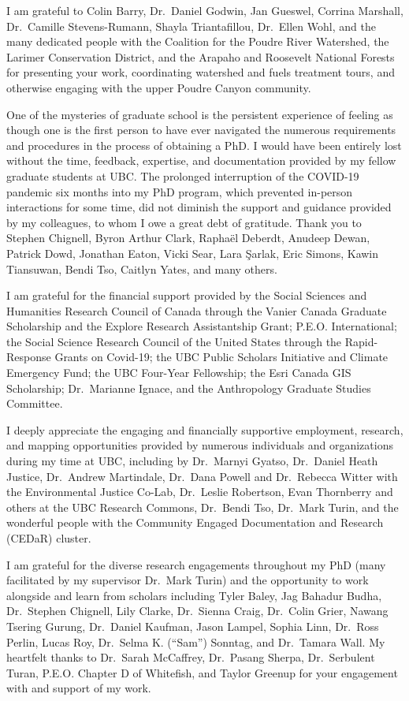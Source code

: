\documentclass[
]{article}
\begin{document}
I am grateful to Colin Barry, Dr.~Daniel Godwin, Jan Gueswel, Corrina Marshall, Dr.~Camille Stevens-Rumann, Shayla Triantafillou, Dr.~Ellen Wohl, and the many dedicated people with the Coalition for the Poudre River Watershed, the Larimer Conservation District, and the Arapaho and Roosevelt National Forests for presenting your work, coordinating watershed and fuels treatment tours, and otherwise engaging with the upper Poudre Canyon community.

One of the mysteries of graduate school is the persistent experience of feeling as though one is the first person to have ever navigated the numerous requirements and procedures in the process of obtaining a PhD. I would have been entirely lost without the time, feedback, expertise, and documentation provided by my fellow graduate students at UBC. The prolonged interruption of the COVID-19 pandemic six months into my PhD program, which prevented in-person interactions for some time, did not diminish the support and guidance provided by my colleagues, to whom I owe a great debt of gratitude. Thank you to Stephen Chignell, Byron Arthur Clark, Raphaël Deberdt, Anudeep Dewan, Patrick Dowd, Jonathan Eaton, Vicki Sear, Lara Şarlak, Eric Simons, Kawin Tiansuwan, Bendi Tso, Caitlyn Yates, and many others.

I am grateful for the financial support provided by the Social Sciences and Humanities Research Council of Canada through the Vanier Canada Graduate Scholarship and the Explore Research Assistantship Grant; P.E.O. International; the Social Science Research Council of the United States through the Rapid-Response Grants on Covid-19; the UBC Public Scholars Initiative and Climate Emergency Fund; the UBC Four-Year Fellowship; the Esri Canada GIS Scholarship; Dr.~Marianne Ignace, and the Anthropology Graduate Studies Committee.

I deeply appreciate the engaging and financially supportive employment, research, and mapping opportunities provided by numerous individuals and organizations during my time at UBC, including by Dr.~Marnyi Gyatso, Dr.~Daniel Heath Justice, Dr.~Andrew Martindale, Dr.~Dana Powell and Dr.~Rebecca Witter with the Environmental Justice Co-Lab, Dr.~Leslie Robertson, Evan Thornberry and others at the UBC Research Commons, Dr.~Bendi Tso, Dr.~Mark Turin, and the wonderful people with the Community Engaged Documentation and Research (CEDaR) cluster.

I am grateful for the diverse research engagements throughout my PhD (many facilitated by my supervisor Dr.~Mark Turin) and the opportunity to work alongside and learn from scholars including Tyler Baley, Jag Bahadur Budha, Dr.~Stephen Chignell, Lily Clarke, Dr.~Sienna Craig, Dr.~Colin Grier, Nawang Tsering Gurung, Dr.~Daniel Kaufman, Jason Lampel, Sophia Linn, Dr.~Ross Perlin, Lucas Roy, Dr.~Selma K. (``Sam'') Sonntag, and Dr.~Tamara Wall. My heartfelt thanks to Dr.~Sarah McCaffrey, Dr.~Pasang Sherpa, Dr.~Serbulent Turan, P.E.O. Chapter D of Whitefish, and Taylor Greenup for your engagement with and support of my work.
\end{document}
